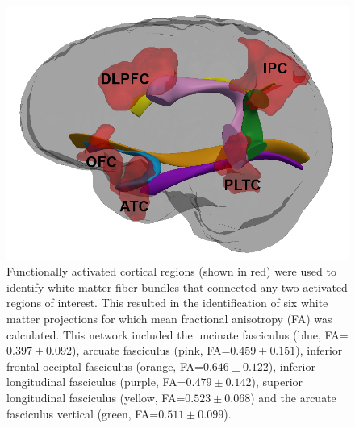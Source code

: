 \documentclass[final,authoryear,5p,times,twocolumn]{elsarticle}
\begin{document}
\begin{figure}[h]
\begin{center}
\includegraphics[width=1.0\linewidth]{figures/big_homo_labeled.png}
\caption{Functionally activated cortical regions (shown in red) were used to identify white matter fiber bundles that connected any two activated regions of interest. This resulted in the identification of six white matter projections for which mean fractional anisotropy (FA) was calculated. This network included the uncinate fasciculus (blue, FA=$0.397 \pm 0.092$), arcuate fasciculus (pink, FA=$0.459 \pm 0.151$), inferior frontal-occiptal fasciculus (orange, FA=$0.646 \pm 0.122$), inferior longitudinal fasciculus (purple, FA=$0.479 \pm 0.142$), superior longitudinal fasciculus (yellow, FA=$0.523 \pm 0.068$) and the arcuate fasciculus vertical (green, FA=$0.511 \pm 0.099$).}
\label{fig:networkmodel}
\end{center}
\end{figure}
\end{document}
